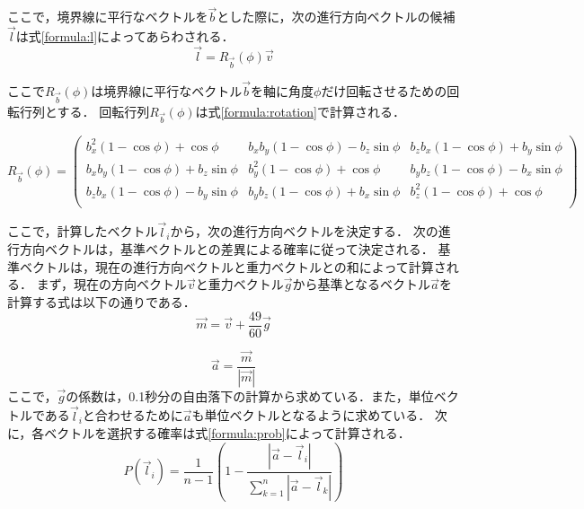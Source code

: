 \documentclass[a4paper,11pt]{jarticle}
\begin{document}
	ここで，境界線に平行なベクトルを$\vec{b} $とした際に，次の進行方向ベクトルの候補$\vec{l}$は式\ref{formula:l}によってあらわされる．
	\begin{equation}
	\label{formula:l}
	\vec{l} = R_{\vec{b}}(\phi)\vec{v}
	\end{equation}
	
	ここで$R_{\vec{b}}(\phi)$は境界線に平行なベクトル$\vec{b}$を軸に角度$\phi$だけ回転させるための回転行列とする．
	回転行列$R_{\vec{b}}(\phi)$は式\ref{formula:rotation}で計算される．
	
	\begin{equation}
	\label{formula:rotation}
	R_{\vec{b}}(\phi)=\left( \begin{array}{ccc}
	b_x^2(1-\cos\phi)+\cos\phi & b_x b_y (1-\cos\phi) - b_z\sin\phi & b_z b_x (1-\cos\phi) + b_y\sin\phi \\
	b_x b_y (1-\cos\phi)+b_z \sin\phi & b_y^2 (1-\cos\phi) + \cos\phi & b_y b_z (1-\cos\phi) - b_x\sin\phi \\
	b_z b_x (1-\cos\phi)- b_y\sin\phi & b_y b_z (1-\cos\phi) + b_x \sin\phi & b_z^2 (1-\cos\phi) + \cos\phi \\
	\end{array} \right)
	\end{equation}
	
	ここで，計算したベクトル$\vec{l}_i$から，次の進行方向ベクトルを決定する．
	次の進行方向ベクトルは，基準ベクトルとの差異による確率に従って決定される．
	基準ベクトルは，現在の進行方向ベクトルと重力ベクトルとの和によって計算される．
	まず，現在の方向ベクトル$ \vec{v} $と重力ベクトル$ \vec{g} $から基準となるベクトル$ \vec{a} $を計算する式は以下の通りである．
	\begin{equation}
	\vec{m} = \vec{v} +\frac{49}{60} \vec{g} 
	\end{equation}
	
	\begin{equation}
	\vec{a} = \frac{\vec{m}}{|\vec{m}|}
	\end{equation}
	ここで，$ \vec{g} $の係数は，0.1秒分の自由落下の計算から求めている．また，単位ベクトルである$\vec{l}_i$と合わせるために$\vec{a}$も単位ベクトルとなるように求めている．
	次に，各ベクトルを選択する確率は式\ref{formula:prob}によって計算される．
	\begin{equation}
	\label{formula:prob}
	P(\vec{l}_i) = \frac{1}{n-1}(1 - \frac{|\vec{a} - \vec{l}_i |}{\sum_{k=1}^{n}|\vec{a} - \vec{l}_k|})
	\end{equation}
	
\end{document}

